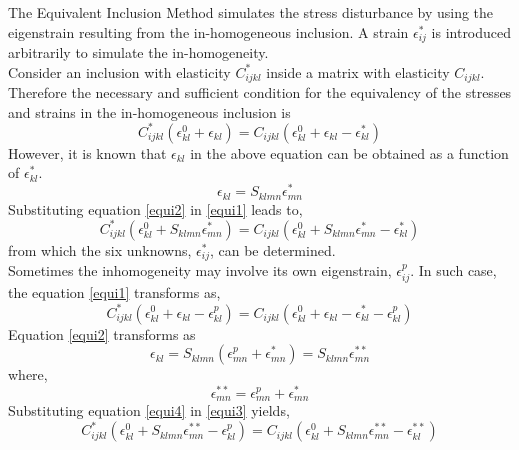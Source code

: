 \documentclass[12pt, a4paper]{report}
\begin{document}
The Equivalent Inclusion Method simulates the stress disturbance by using the eigenstrain resulting from the in-homogeneous inclusion. A strain $\epsilon_{ij}^{*}$ is introduced arbitrarily to simulate the in-homogeneity. \\

Consider an inclusion with elasticity $C_{ijkl}^{*}$ inside a matrix with elasticity $C_{ijkl}$. Therefore the necessary and sufficient condition for the equivalency of the stresses and strains in the in-homogeneous inclusion is 
\begin{equation}
    C_{ijkl}^{*}(\epsilon_{kl}^{0} + \epsilon_{kl}) = C_{ijkl}(\epsilon_{kl}^{0} + \epsilon_{kl} - \epsilon^{*}_{kl})
    \label{equi1}
\end{equation}
However, it is known that $\epsilon_{kl}$ in the above equation can be obtained as a function of $\epsilon^{*}_{kl}$.
\begin{equation}
    \epsilon_{kl} = S_{klmn}\epsilon_{mn}^{*}
    \label{equi2}
\end{equation}
Substituting equation \ref{equi2} in \ref{equi1} leads to,
\begin{equation}
    C_{ijkl}^{*}(\epsilon_{kl}^{0} + S_{klmn}\epsilon_{mn}^{*}) = C_{ijkl}(\epsilon_{kl}^{0} + S_{klmn}\epsilon_{mn}^{*} - \epsilon^{*}_{kl})
\end{equation}
from which the six unknowns, $\epsilon_{ij}^{*}$, can be determined. \\

Sometimes the inhomogeneity may involve its own eigenstrain, $\epsilon_{ij}^{p}$. In such case, the equation \ref{equi1} transforms as,
\begin{equation}
    C_{ijkl}^{*}(\epsilon_{kl}^{0} + \epsilon_{kl} - \epsilon_{kl}^{p}) = C_{ijkl}(\epsilon_{kl}^{0} + \epsilon_{kl} - \epsilon^{*}_{kl} - \epsilon_{kl}^{p})
    \label{equi3}
\end{equation}
Equation \ref{equi2} transforms as
\begin{equation}
    \epsilon_{kl} = S_{klmn}(\epsilon_{mn}^{p} + \epsilon_{mn}^{*}) = S_{klmn}\epsilon_{mn}^{**}
    \label{equi4}
\end{equation}
where,
\begin{equation}
    \epsilon_{mn}^{**} = \epsilon_{mn}^{p} + \epsilon_{mn}^{*}
\end{equation}
Substituting equation \ref{equi4} in \ref{equi3} yields,
\begin{equation}
    C_{ijkl}^{*}(\epsilon_{kl}^{0} + S_{klmn}\epsilon_{mn}^{**} - \epsilon_{kl}^{p}) = C_{ijkl}(\epsilon_{kl}^{0} + S_{klmn}\epsilon_{mn}^{**} - \epsilon^{**}_{kl})
\end{equation}
\end{document}
